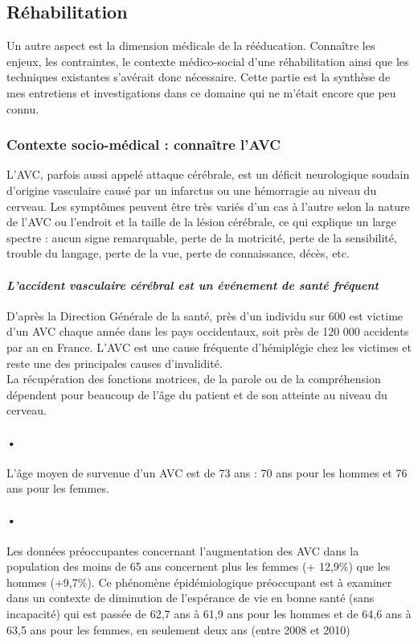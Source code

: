 \newpage
	\subsection{Réhabilitation}
Un autre aspect est la dimension médicale de la rééducation. Connaître les enjeux, les contraintes, le contexte médico-social d'une réhabilitation ainsi que les techniques existantes s'avérait donc nécessaire. Cette partie est la synthèse de mes entretiens et investigations dans ce domaine qui ne m'était encore que peu connu.

		\subsubsection{Contexte socio-médical : connaître l'AVC}
L'\gls{AVC}, parfois aussi appelé attaque cérébrale, est un déficit neurologique soudain d'origine vasculaire causé par un infarctus ou une hémorragie au niveau du cerveau. Les symptômes peuvent être très variés d'un cas à l'autre selon la nature de l'AVC ou l'endroit et la taille de la lésion cérébrale, ce qui explique un large spectre : aucun signe remarquable, perte de la motricité, perte de la sensibilité, trouble du langage, perte de la vue, perte de connaissance, décès, etc.	

		\paragraph{\emph{L’accident vasculaire cérébral est un événement de santé fréquent}\\}
D'après la Direction Générale de la santé\cite{Dire12}, près d'un individu sur 600 est victime d'un AVC chaque année dans les pays occidentaux, soit près de 120 000 accidents par an en France. L'AVC est une cause fréquente d'hémiplégie chez les victimes et reste une des principales causes d'invalidité. \\
La récupération des fonctions motrices, de la parole ou de la compréhension dépendent pour beaucoup de l'âge du patient et de son atteinte au niveau du cerveau.

\paragraph{•}L’âge moyen de survenue d’un AVC est de 73 ans : 70 ans pour les hommes et 76 ans pour les femmes.

\paragraph{•}   Les données préoccupantes concernant l’augmentation des AVC dans la population des moins de 65 ans concernent plus les femmes (+ 12,9\%) que les hommes (+9,7\%). Ce phénomène épidémiologique préoccupant est à examiner dans un contexte de diminution de l’espérance de vie en bonne santé (sans incapacité) qui est passée de 62,7 ans à 61,9 ans pour les hommes et de 64,6 ans à 63,5 ans pour les femmes, en seulement deux ans (entre 2008 et 2010)

